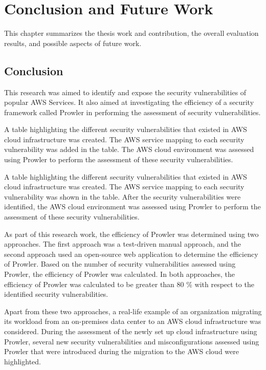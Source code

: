 
\chapter{Conclusion and Future Work}

\par This chapter summarizes the thesis work and contribution, the overall evaluation results, and possible aspects of future work.

\section{Conclusion}

\par This research was aimed to identify and expose the security vulnerabilities of popular AWS Services.
It also aimed at investigating the efficiency of a security framework called Prowler in performing the assessment of security vulnerabilities.


\par A table highlighting the different security vulnerabilities that existed in AWS cloud infrastructure was created.
The AWS service mapping to each security vulnerability
was added in the table.
The AWS cloud environment was assessed using Prowler to
perform the assessment of these security vulnerabilities.

\par A table highlighting the different security vulnerabilities that existed in AWS cloud infrastructure was created.
The AWS service mapping to each security vulnerability was shown in the table.
After the security vulnerabilities were identified, the AWS cloud environment was assessed using Prowler to perform the assessment of these security vulnerabilities.


\par As part of this research work, the efficiency of Prowler was determined using two approaches.
The first approach was a test-driven manual approach, and the second approach used an open-source web application to determine the efficiency of Prowler.
Based on the number of security vulnerabilities assessed using Prowler, the efficiency of Prowler was calculated.
In both approaches, the efficiency of Prowler was
calculated to be greater than 80 \% with respect to the identified security vulnerabilities.


\par Apart from these two approaches, a real-life example of an organization migrating its workload from an on-premises data center to an AWS cloud infrastructure was considered.
During the assessment of the newly set up cloud infrastructure using Prowler, several new security vulnerabilities and misconfigurations assessed using Prowler that were introduced during the migration to the AWS cloud were highlighted.

